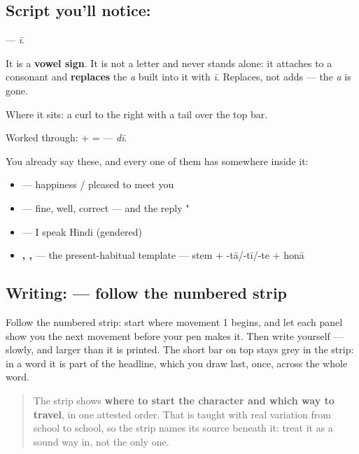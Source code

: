 \subsection*{Script you'll notice: }
\textbf{} — \emph{ī}.

It is a \textbf{vowel sign}. It is not a letter and never stands alone: it attaches to a consonant and \textbf{replaces} the \emph{a} built into it with \emph{ī}. Replaces, not adds — the \emph{a} is gone.

Where it sits: a curl to the right with a tail over the top bar.

Worked through: \textbf{} + \textbf{} = \textbf{} — \emph{dī}.

You already say these, and every one of them has  somewhere inside it:

\begin{itemize}
\raggedright
  \item \textbf{} — happiness / pleased to meet you
  \item \textbf{} — fine, well, correct — and the reply "  
  \item \textbf{   } — I speak Hindi (gendered)
  \item \textbf{ ,  ,  } — the present-habitual template — stem + -tā/-tī/-te + honā
\end{itemize}

\subsection*{Writing:  — follow the numbered strip}

Follow the numbered strip: start where movement 1 begins, and let each panel show you the next movement before your pen makes it. Then write  yourself — slowly, and larger than it is printed. The short bar on top stays grey in the strip: in a word it is part of the headline, which you draw last, once, across the whole word.

\begin{quote}
The strip shows \textbf{where to start the character and which way to travel}, in one attested order. That is taught with real variation from school to school, so the strip names its source beneath it: treat it as a sound way in, not the only one.
\end{quote}

